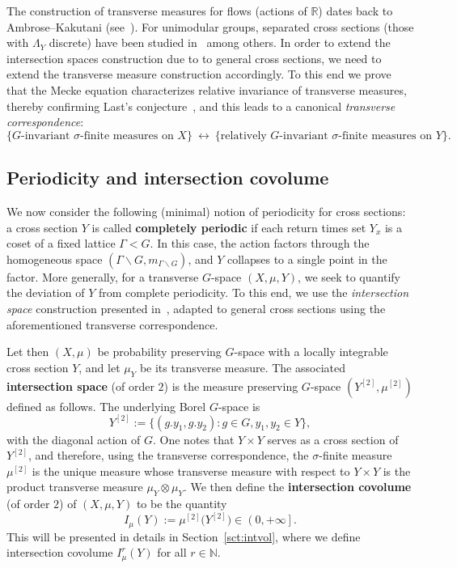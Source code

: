 \documentclass{amsart}
\numberwithin{equation}{subsection}
\theoremstyle{remark}
\begin{document}
\smallskip

The construction of transverse measures for flows (actions of \(\mathbb{R}\)) dates back to Ambrose--Kakutani (see~\cite[\S12]{nadkarni2013}). For unimodular groups, separated cross sections (those with \(\Lambda_{Y}\) discrete) have been studied in~\cite{avni2010entropy, kyed2015, Slutsky2017, bjorklund2025int} among others. In order to extend the intersection spaces construction due to \cite{bjorklund2025int} to general cross sections, we need to extend the transverse measure construction accordingly. To this end we prove that the Mecke equation characterizes relative invariance of transverse measures, thereby confirming Last's conjecture~\cite[\S3.10]{last2009}, and this leads to a canonical {\em transverse correspondence}:
\[\bigl\{\text{\(G\)-invariant \(\sigma\)-finite measures on } X\bigr\}\ \longleftrightarrow\ \bigl\{\text{relatively \(G\)-invariant \(\sigma\)-finite measures on }Y\bigr\}.\]

\subsection{Periodicity and intersection covolume}

We now consider the following (minimal) notion of periodicity for cross sections: a cross section \(Y\) is called {\bf completely periodic} if each return times set \(Y_{x}\) is a coset of a fixed lattice \(\Gamma<G\). In this case, the action factors through the homogeneous space \(\left(\Gamma\backslash G,m_{\Gamma\backslash G}\right)\), and \(Y\) collapses to a single point in the factor. More generally, for a transverse \(G\)-space \(\left(X,\mu,Y\right)\), we seek to quantify the deviation of \(Y\) from complete periodicity. To this end, we use the \emph{intersection space} construction presented in~\cite{bjorklund2025int}, adapted to general cross sections using the aforementioned transverse correspondence.

\smallskip

Let then \(\left(X,\mu\right)\) be probability preserving \(G\)-space with a locally integrable cross section \(Y\), and let \(\mu_{Y}\) be its transverse measure. The associated {\bf intersection space} (of order \(2\)) is the measure preserving \(G\)-space \(\left(Y^{\left[2\right]},\mu^{\left[2\right]}\right)\) defined as follows. The underlying Borel \(G\)-space is
\[Y^{\left[2\right]}:=\{\left(g.y_{1},g.y_{2}\right):g\in G,y_{1},y_{2}\in Y\},\]
with the diagonal action of \(G\). One notes that \(Y\times Y\) serves as a cross section of \(Y^{\left[2\right]}\), and therefore, using the transverse correspondence, the \(\sigma\)-finite measure \(\mu^{\left[2\right]}\) is the unique measure whose transverse measure with respect to \(Y\times Y\) is the product transverse measure \(\mu_{Y}\otimes\mu_{Y}\). We then define the {\bf intersection covolume} (of order \(2\)) of \(\left(X,\mu,Y\right)\) to be the quantity
\[I_{\mu}\left(Y\right):=\mu^{\left[2\right]}\big(Y^{\left[2\right]}\big)\in\left(0,+\infty\right].\]
This will be presented in details in Section~\ref{sct:intvol}, where we define intersection covolume \(I_{\mu}^{r}\left(Y\right)\) for all \(r\in\mathbb{N}\).
\end{document}
